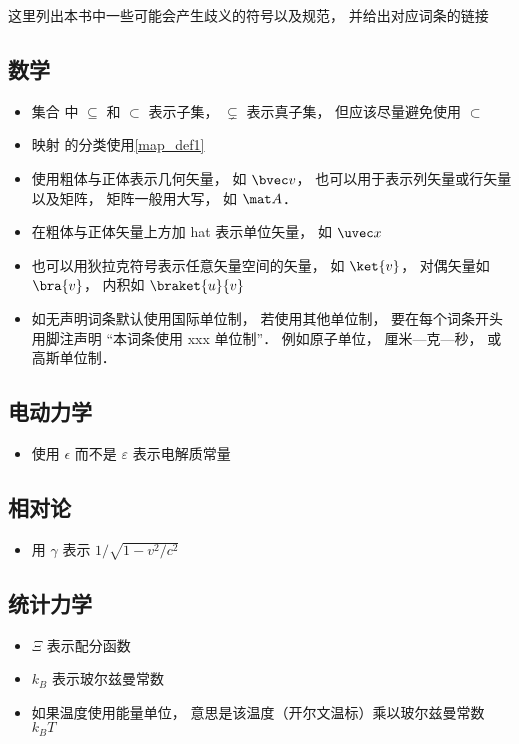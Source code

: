 
这里列出本书中一些可能会产生歧义的符号以及规范， 并给出对应词条的链接

\subsection{数学}
\begin{itemize}
\item 集合 中 $\subseteq$ 和 $\subset$ 表示子集， $\subsetneq$ 表示真子集， 但应该尽量避免使用 $\subset$
\item 映射 的分类使用\autoref{map_def1}
\item 使用粗体与正体表示几何矢量， 如 $\bvec v$， 也可以用于表示列矢量或行矢量以及矩阵， 矩阵一般用大写， 如 $\mat A$．
\item 在粗体与正体矢量上方加 hat 表示单位矢量， 如 $\uvec x$
\item 也可以用狄拉克符号表示任意矢量空间的矢量， 如 $\ket{v}$， 对偶矢量如 $\bra{v}$， 内积如 $\braket{u}{v}$
\item 如无声明词条默认使用国际单位制， 若使用其他单位制， 要在每个词条开头用脚注声明 “本词条使用 xxx 单位制”． 例如原子单位， 厘米—克—秒， 或高斯单位制．
\end{itemize}

\subsection{电动力学}
\begin{itemize}
\item 使用 $\epsilon$ 而不是 $\varepsilon$ 表示电解质常量
\end{itemize}

\subsection{相对论}
\begin{itemize}
\item 用 $\gamma$ 表示 $1/\sqrt{1 - v^2/c^2}$
\end{itemize}

\subsection{统计力学}
\begin{itemize}
\item $\Xi$ 表示配分函数
\item $k_B$ 表示玻尔兹曼常数
\item 如果温度使用能量单位， 意思是该温度（开尔文温标）乘以玻尔兹曼常数 $k_B T$
\end{itemize}
